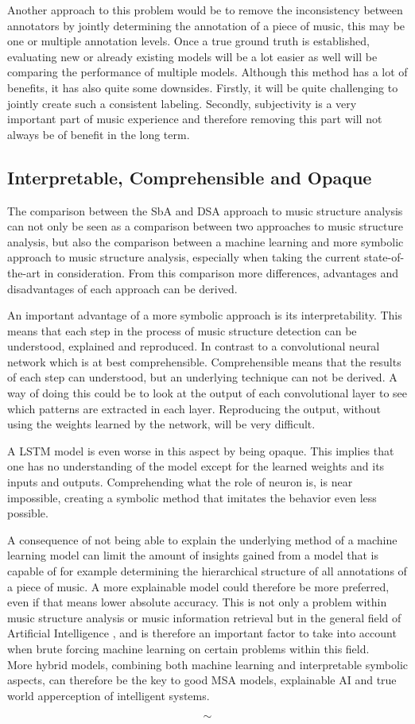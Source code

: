 Another approach to this problem would be to remove the inconsistency between annotators by jointly determining the annotation of a piece of music, this may be one or multiple annotation levels. Once a true ground truth is established, evaluating new or already existing models will be a lot easier as well will be comparing the performance of multiple models. Although this method has a lot of benefits, it has also quite some downsides. Firstly, it will be quite challenging to jointly create such a consistent labeling. Secondly, subjectivity is a very important part of music experience and therefore removing this part will not always be of benefit in the long term.

\subsection{Interpretable, Comprehensible and Opaque}
The comparison between the SbA and DSA approach to music structure analysis can not only be seen as a comparison between two approaches to music structure analysis, but also the comparison between a machine learning and more symbolic approach to music structure analysis, especially when taking the current state-of-the-art in consideration. From this comparison more differences, advantages and disadvantages of each approach can be derived.

An important advantage of a more symbolic approach is its interpretability. This means that each step in the process of music structure detection can be understood, explained and reproduced. In contrast to a convolutional neural network which is at best comprehensible. Comprehensible means that the results of each step can understood, but an underlying technique can not be derived. A way of doing this could be to look at the output of each convolutional layer to see which patterns are extracted in each layer. Reproducing the output, without using the weights learned by the network, will be very difficult.

A LSTM model is even worse in this aspect by being opaque. This implies that one has no understanding of the model except for the learned weights and its inputs and outputs. Comprehending what the role of neuron is, is near impossible, creating a symbolic method that imitates the behavior even less possible. 

A consequence of not being able to explain the underlying method of a machine learning model can limit the amount of insights gained from a model that is capable of for example determining the hierarchical structure of all annotations of a piece of music. A more explainable model could therefore be more preferred, even if that means lower absolute accuracy. This is not only a problem within music structure analysis or music information retrieval but in the general field of Artificial Intelligence \cite{Doran2017does}, and is therefore an important factor to take into account when brute forcing machine learning on certain problems within this field.\\

More hybrid models, combining both machine learning and interpretable symbolic aspects, can therefore be the key to good MSA models, explainable AI and true world apperception of intelligent systems.

\null\vfill
\huge
$$\sim$$
\normalsize
\vfill\vfill
